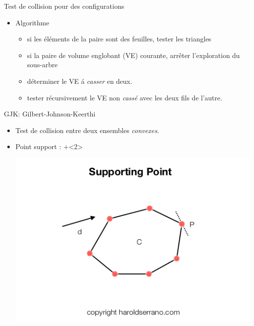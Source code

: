\begin{frame} {Test de collision pour des configurations}
  \begin{itemize}
    \item Algorithme
      \begin{itemize}
        \item si les \'el\'ements de la paire sont des feuilles, tester les triangles
        \item si la paire de volume englobant (VE) courante, arr\^eter l'exploration du sous-arbre
        \item d\'eterminer le VE \'a \emph{casser} en deux.
        \item tester r\'ecursivement le VE non \emph{cass\'e} avec les deux fils de l'autre.
      \end{itemize}
  \end{itemize}

\end{frame}

%
%

\begin{frame} {GJK: Gilbert-Johnson-Keerthi}
  \begin{itemize}
    \item Test de collision entre deux ensembles \emph{convexes}.
    \item<2> Point support :
      \onslide+<2>{ \centerline { \includegraphics[width=.8\linewidth]{img/gjk/support.jpeg} } }
  \end{itemize}
\end{frame}

